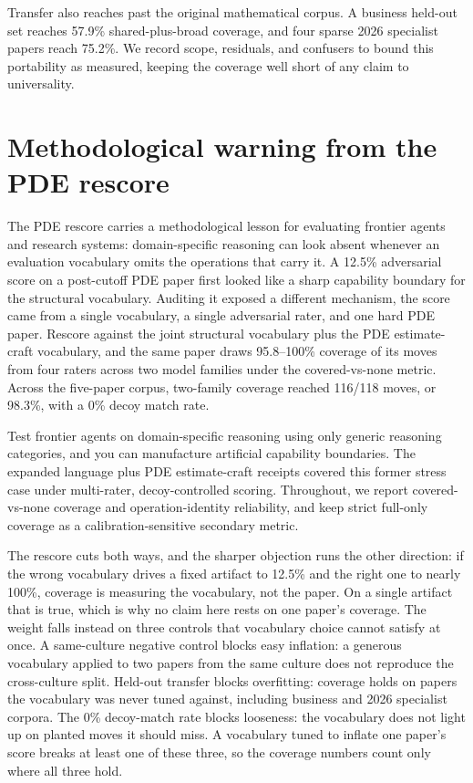 \documentclass[11pt]{article}
\begin{document}
Transfer also reaches past the original mathematical corpus. A business held-out
set reaches 57.9\% shared-plus-broad coverage, and four sparse 2026 specialist
papers reach 75.2\%. We record scope, residuals, and confusers to bound this
portability as measured, keeping the coverage well short of any claim to
universality.

\section{Methodological warning from the PDE rescore}

The PDE rescore carries a methodological lesson for evaluating frontier agents
and research systems: domain-specific reasoning can look absent whenever an
evaluation vocabulary omits the operations that carry it. A 12.5\% adversarial
score on a post-cutoff PDE paper first looked like a sharp capability boundary for
the structural vocabulary. Auditing it exposed a different mechanism, the score
came from a single vocabulary, a single adversarial rater, and one hard PDE paper.
Rescore against the joint structural vocabulary plus the PDE estimate-craft
vocabulary, and the same paper draws 95.8--100\% coverage of its moves from four
raters across two model families under the covered-vs-none metric. Across the
five-paper corpus, two-family coverage reached 116/118 moves, or 98.3\%, with a
0\% decoy match rate.


Test frontier agents on domain-specific reasoning using only generic reasoning
categories, and you can manufacture artificial capability boundaries. The
expanded language plus PDE estimate-craft receipts covered this former stress
case under multi-rater, decoy-controlled scoring. Throughout, we report
covered-vs-none coverage and operation-identity reliability, and keep strict
full-only coverage as a calibration-sensitive secondary metric.

The rescore cuts both ways, and the sharper objection runs the other
direction: if the wrong vocabulary drives a fixed artifact to 12.5\% and
the right one to nearly 100\%, coverage is measuring the vocabulary, not
the paper. On a single artifact that is true, which is why no claim here
rests on one paper's coverage. The weight falls instead on three controls
that vocabulary choice cannot satisfy at once. A same-culture negative
control blocks easy inflation: a generous vocabulary applied to two papers
from the same culture does not reproduce the cross-culture split. Held-out
transfer blocks overfitting: coverage holds on papers the vocabulary was
never tuned against, including business and 2026 specialist corpora. The
0\% decoy-match rate blocks looseness: the vocabulary does not light up on
planted moves it should miss. A vocabulary tuned to inflate one paper's
score breaks at least one of these three, so the coverage numbers count
only where all three hold.
\end{document}
